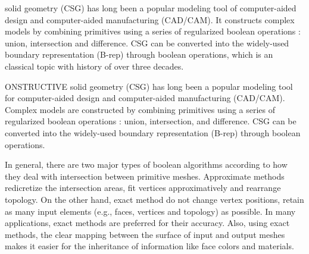 \documentclass[10pt,journal,compsoc]{IEEEtran}
\begin{document}
\maketitle


\IEEEdisplaynontitleabstractindextext
\IEEEpeerreviewmaketitle

 solid geometry (CSG) has long been a popular modeling tool of computer-aided design and computer-aided manufacturing (CAD/CAM). It constructs complex models by combining primitives using a series of regularized boolean operations \cite{requicha1977mathematical,tilove1980closure}: union, intersection and difference. CSG can be converted into the widely-used boundary representation (B-rep) through boolean operations, which is an classical topic with history of over three decades.


ONSTRUCTIVE solid geometry (CSG) has long been a popular modeling tool for computer-aided design and computer-aided manufacturing (CAD/CAM). Complex models are constructed by combining primitives using a series of regularized boolean operations \cite{requicha1977mathematical,tilove1980closure}: union, intersection, and difference. CSG can be converted into the widely-used boundary representation (B-rep) through boolean operations.


In general, there are two major types of boolean algorithms according to how they deal with intersection between primitive meshes. Approximate methods \cite{wang2011approximate,pavic2010hybrid,biermann2001approximate} redicretize the intersection areas, fit vertices approximatively and rearrange topology. On the other hand, exact method do not change vertex positions, retain as many input elements  (e.g., faces, vertices and topology) as possible. In many applications, exact methods are preferred for their accuracy. Also, using exact methods, the clear mapping between the surface of input and output meshes makes it easier for the inheritance of information like face colors and materials.
\end{document}

